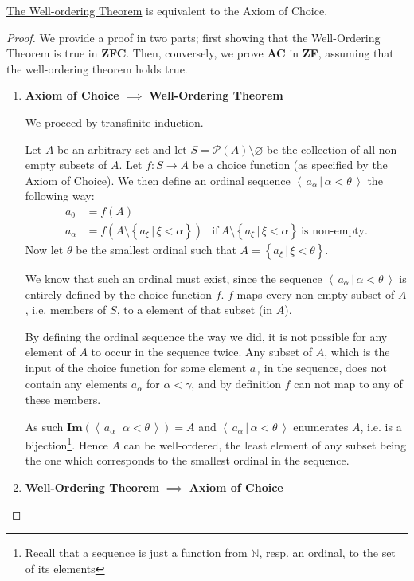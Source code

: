\documentclass[../../main.tex]{subfiles}
\begin{document}
\begin{theorem}
    \hyperref[well-order-thm]{The Well-ordering Theorem} is equivalent to the Axiom of Choice. %
\end{theorem}

\begin{proof} \cite[p.39]{Jec78}
    We provide a proof in two parts; first showing that the Well-Ordering Theorem is true in \textbf{ZFC}.
    Then, conversely, we prove \textbf{AC} in \textbf{ZF}, assuming that the well-ordering theorem holds true.
    \begin{enumerate}
        \item \textbf{Axiom of Choice} $\implies$ \textbf{Well-Ordering Theorem}
        
        We proceed by transfinite induction.

        Let $A$ be an arbitrary set and let $S = \mathcal{P}(A) \setminus \varnothing$ be the collection of all non-empty subsets of $A$.
        Let $f: S \to A$ be a choice function (as specified by the Axiom of Choice).
        We then define an ordinal sequence $\left< \, a_{\alpha} \, \vert \, \alpha < \theta \, \right>$ the following way:
        \begin{align*}
            a_0 &= f(A)\\
            a_{\alpha} &= f\left(A \setminus \left\{a_\xi \, \vert \, \xi < \alpha\right\} \right)
            &\text{if}\ A \setminus \left\{a_\xi \, \vert \, \xi < \alpha\right\}\ \text{is non-empty}.
        \end{align*}
        Now let $\theta$ be the smallest ordinal such that $A = \left\{a_\xi \, \vert \, \xi < \theta\right\}$.
        
        We know that such an ordinal must exist, since the sequence $\left< \, a_{\alpha} \, \vert \, \alpha < \theta \, \right>$ is entirely defined by the choice function $f$.
        $f$ maps every non-empty subset of $A$, i.e. members of $S$, to a element of that subset (in $A$).
        
        By defining the ordinal sequence the way we did, it is not possible for any element of $A$ to occur in the sequence twice.
        Any subset of $A$, which is the input of the choice function for some element $a_\gamma$ in the sequence, does not contain any elements $a_\alpha$ for $\alpha < \gamma$, and by definition $f$ can not map to any of these members.
        
        As such $\mathbf{Im}\left(\left< \, a_{\alpha} \, \vert \, \alpha < \theta \, \right>\right) = A$
        and $\left< \, a_{\alpha} \, \vert \, \alpha < \theta \, \right>$ enumerates $A$, i.e. is a bijection\footnote{Recall that a sequence is just a function from $\mathbb{N}$, resp. an ordinal, to the set of its elements}.
        Hence $A$ can be well-ordered, the least element of any subset being the one which corresponds to the smallest ordinal in the sequence.
        \item \textbf{Well-Ordering Theorem} $\implies$ \textbf{Axiom of Choice}
        

\end{enumerate}
\end{proof}
\end{document}
